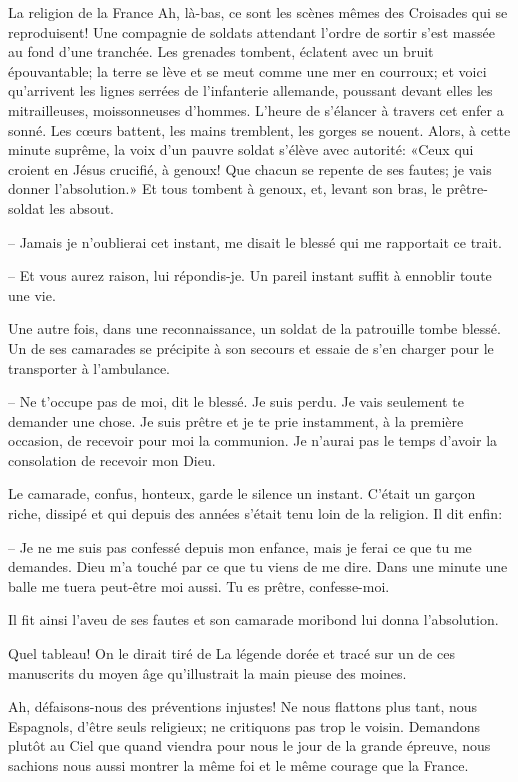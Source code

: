 \begin{chapter}{La religion de la France}
Ah, là-bas, ce sont les scènes mêmes des Croisades qui se reproduisent!
Une compagnie de soldats attendant l'ordre de sortir s'est massée au
fond d'une tranchée. Les grenades tombent, éclatent avec un bruit
épouvantable; la terre se lève et se meut comme une mer en courroux; et
voici qu'arrivent les lignes serrées de l'infanterie allemande, poussant
devant elles les mitrailleuses, moissonneuses d'hommes. L'heure de
s'élancer à travers cet enfer a sonné. Les cœurs battent, les mains
tremblent, les gorges se nouent. Alors, à cette minute suprême, la voix
d'un pauvre soldat s'élève avec autorité: «Ceux qui croient en Jésus
crucifié, à genoux! Que chacun se repente de ses fautes; je vais donner
l'absolution.» Et tous tombent à genoux, et, levant son bras, le
prêtre-soldat les absout.

-- Jamais je n'oublierai cet instant, me disait le blessé qui me
rapportait ce trait.

-- Et vous aurez raison, lui répondis-je. Un pareil instant suffit à
ennoblir toute une vie.

Une autre fois, dans une reconnaissance, un soldat de la patrouille
tombe blessé. Un de ses camarades se précipite à son secours et essaie
de s'en charger pour le transporter à l'ambulance.

-- Ne t'occupe pas de moi, dit le blessé. Je suis perdu. Je vais
seulement te demander une chose. Je suis prêtre et je te prie
instamment, à la première occasion, de recevoir pour moi la communion.
Je n'aurai pas le temps d'avoir la consolation de recevoir mon Dieu.

Le camarade, confus, honteux, garde le silence un instant. C'était un
garçon riche, dissipé et qui depuis des années s'était tenu loin de la
religion. Il dit enfin:

-- Je ne me suis pas confessé depuis mon enfance, mais je ferai ce que tu
me demandes. Dieu m'a touché par ce que tu viens de me dire. Dans une
minute une balle me tuera peut-être moi aussi. Tu es prêtre,
confesse-moi.

Il fit ainsi l'aveu de ses fautes et son camarade moribond lui donna
l'absolution.

Quel tableau! On le dirait tiré de La légende dorée et tracé sur un de
ces manuscrits du moyen âge qu'illustrait la main pieuse des moines.

Ah, défaisons-nous des préventions injustes! Ne nous flattons plus tant,
nous Espagnols, d'être seuls religieux; ne critiquons pas trop le
voisin. Demandons plutôt au Ciel que quand viendra pour nous le jour de
la grande épreuve, nous sachions nous aussi montrer la même foi et le
même courage que la France.

\end{chapter}


